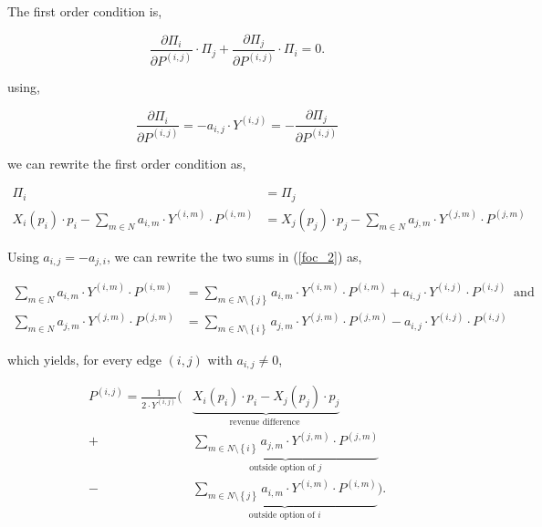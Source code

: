 \documentclass[american]{scrartcl}
\newcommand{\set}[1]{\left\{#1\right\}}
\begin{document}
The first order condition is,

\begin{equation}
	\frac{\partial\Pi_i}{\partial P^{(i, j)}} \cdot \Pi_j + \frac{\partial\Pi_j}{\partial P^{(i, j)}} \cdot \Pi_i = 0.
\end{equation}

using,

\begin{equation}
	\frac{\partial\Pi_i}{\partial P^{(i, j)}} = - a_{i, j} \cdot Y^{(i, j)} = -\frac{\partial \Pi_j}{\partial P^{(i, j)}}
\end{equation}

we can rewrite the first order condition as,

\begin{equation} \label{foc_2}
	\begin{split}
		\Pi_i &= \Pi_j \\
		X_i(p_i)\cdot p_i - \sum_{m \in N} a_{i, m} \cdot Y^{(i, m)} \cdot P^{(i, m)} &= X_j(p_j)\cdot p_j - \sum_{m \in N} a_{j, m} \cdot Y^{(j, m)} \cdot P^{(j, m)}
	\end{split}
\end{equation}

Using $a_{i, j} = - a_{j, i}$, we can rewrite the two sums in (\ref{foc_2}) as,

\begin{equation}
	\begin{split}
		\sum_{m \in N} a_{i, m} \cdot Y^{(i, m)} \cdot P^{(i, m)} &= \sum_{m \in N \setminus \set{j}}  a_{i, m} \cdot Y^{(i, m)} \cdot P^{(i, m)} + a_{i, j} \cdot Y^{(i, j)} \cdot P^{(i, j)} \ \text{ and }\\
		\sum_{m \in N} a_{j, m} \cdot Y^{(j, m)} \cdot P^{(j, m)} &=  \sum_{m \in N \setminus \set{i}}  a_{j, m} \cdot Y^{(j, m)} \cdot P^{(j, m)} - a_{i, j} \cdot Y^{(i, j)} \cdot P^{(i, j)}
	\end{split}
\end{equation}

which yields, for every edge $(i, j)$ with $ a_{i, j} \neq 0$,

\begin{equation} \label{solution}
	\begin{split}
		P^{(i, j)} = \frac{1}{2\cdot Y^{(i, j)}} \Biggl( &\underbrace{X_i(p_i)\cdot p_i - X_j(p_j)\cdot p_j}_{\text{revenue difference }}
		\\  + &\underbrace{\sum_{m\in N\setminus \set{i}} a_{j, m} \cdot Y^{(j, m)} \cdot P^{(j, m)}}_{\text{outside option of } j}
		\\ - & \underbrace{\sum_{m \in N\setminus \set{j}} a_{i, m} \cdot Y^{(i, m)} \cdot P^{(i, m)}}_{\text{outside option of } i} \Biggr).
	\end{split}
\end{equation}
\end{document}

